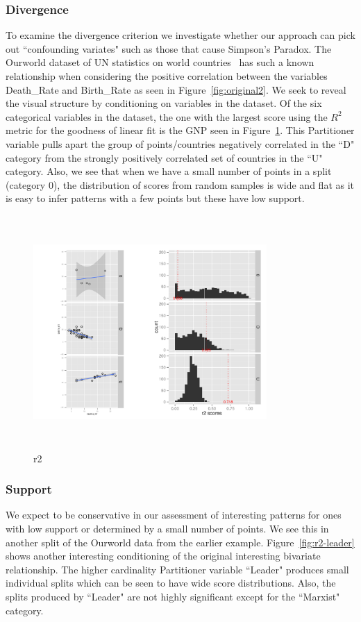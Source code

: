 \subsubsection{Divergence}
To examine the divergence criterion we investigate whether our approach can pick out ``confounding variates" such as those that cause Simpson's Paradox. The Ourworld dataset of UN statistics on world countries~\cite{Wilkinson2005GG,Wilkinson2008} has such a known relationship when considering the positive correlation between the variables Death\_Rate and Birth\_Rate as seen in Figure~\ref{fig:original2}. We seek to reveal the visual structure by conditioning on variables in the dataset. Of the six categorical variables in the dataset, the one with the largest score using the $R^2$ metric for the goodness of linear fit is the GNP seen in Figure~\ref{fig:r2}. This Partitioner variable pulls apart the group of points/countries negatively correlated in the ``D" category from the strongly positively correlated set of countries in the ``U" category. Also, we see that when we have a small number of points in a split (category $0$), the distribution of scores from random samples is wide and flat as it is easy to infer patterns with a few points but these have low support.

\begin{figure}
\raggedleft
\includegraphics[width=3.5in,height=3.5in]{images/6_79024203387873-GNP.pdf}
  \caption{r2}
 \label{fig:r2}
\end{figure}

\subsubsection{Support}
We expect to be conservative in our assessment of interesting patterns for ones with low support or determined by a small number of points. We see this in another split of the Ourworld data from the earlier example. Figure~\ref{fig:r2-leader} shows another interesting conditioning of the original interesting bivariate relationship. The higher cardinality Partitioner variable ``Leader" produces small individual splits which can be seen to have wide score distributions. Also, the splits produced by ``Leader" are not highly significant except for the ``Marxist" category.

